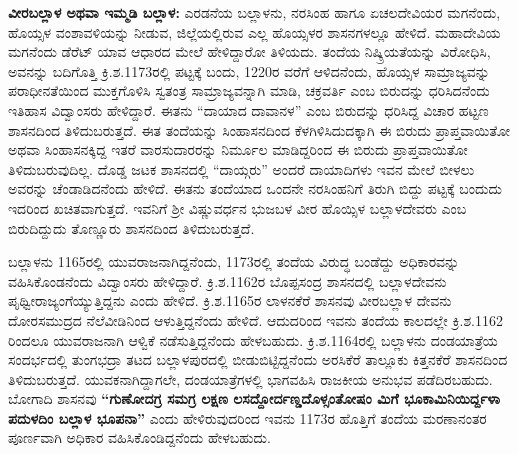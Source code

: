 \textbf{ವೀರಬಲ್ಲಾಳ ಅಥವಾ ಇಮ್ಮಡಿ ಬಲ್ಲಾಳ:} ಎರಡನೆಯ ಬಲ್ಲಾಳನು, ನರಸಿಂಹ ಹಾಗೂ ಏಚಲದೇವಿಯರ ಮಗನೆಂದು, ಹೊಯ್ಸಳ ವಂಶಾವಳಿಯನ್ನು ನೀಡುವ, ಜಿಲ್ಲೆಯಲ್ಲಿರುವ ಎಲ್ಲ ಹೊಯ್ಸಳರ ಶಾಸನಗಳಲ್ಲೂ ಹೇಳಿದೆ. ಮಹಾದೇವಿಯ ಮಗನೆಂದು ಡೆರೆಟ್​ ಯಾವ ಆಧಾರದ ಮೇಲೆ ಹೇಳಿದ್ದಾರೋ ತಿಳಿಯದು. ತಂದೆಯ ನಿಷ್ಕ್ರಿಯತೆಯನ್ನು ವಿರೋಧಿಸಿ, ಅವನನ್ನು ಬದಿಗೊತ್ತಿ ಕ್ರಿ.ಶ.1173ರಲ್ಲಿ ಪಟ್ಟಕ್ಕೆ ಬಂದು, 1220ರ ವರೆಗೆ ಆಳಿದನೆಂದು, ಹೊಯ್ಸಳ ಸಾಮ್ರಾಜ್ಯವನ್ನು ಪರಾಧೀನತೆಯಿಂದ ಮುಕ್ತಗೊಳಿಸಿ ಸ್ವತಂತ್ರ ಸಾಮ್ರಾಜ್ಯವನ್ನಾಗಿ ಮಾಡಿ, ಚಕ್ರವರ್ತಿ ಎಂಬ ಬಿರುದನ್ನು ಧರಿಸಿದನೆಂದು ಇತಿಹಾಸ ವಿದ್ವಾಂಸರು ಹೇಳಿದ್ದಾರೆ. ಈತನು “ದಾಯಾದ ದಾವಾನಳ” ಎಂಬ ಬಿರುದನ್ನು ಧರಿಸಿದ್ದ ವಿಚಾರ ಹಟ್ಟಣ ಶಾಸನದಿಂದ ತಿಳಿದುಬರುತ್ತದೆ. ಈತ ತಂದೆಯನ್ನು ಸಿಂಹಾಸನದಿಂದ ಕೆಳಗಿಳಿಸಿದುದಕ್ಕಾಗಿ ಈ ಬಿರುದು ಪ್ರಾಪ್ತವಾಯಿತೋ ಅಥವಾ ಸಿಂಹಾಸನಕ್ಕಿದ್ದ ಇತರೆ ವಾರಸುದಾರರನ್ನು ನಿರ್ಮೂಲ ಮಾಡಿದ್ದರಿಂದ ಈ ಬಿರುದು ಪ್ರಾಪ್ತವಾಯಿತೋ ತಿಳಿದುಬರುವುದಿಲ್ಲ. ದೊಡ್ಡ ಜಟಕ ಶಾಸನದಲ್ಲಿ “ದಾಯ್ಗರು” ಅಂದರೆ ದಾಯಾದಿಗಳು ಇವನ ಮೇಲೆ ಬೀಳಲು ಅವರನ್ನು ಚೆಂಡಾಡಿದನೆಂದು ಹೇಳಿದೆ. ಈತನು ತಂದೆಯಾದ ಒಂದನೇ ನರಸಿಂಹನಿಗೆ ತಿರುಗಿ ಬಿದ್ದು ಪಟ್ಟಕ್ಕೆ ಬಂದುದು ಇದರಿಂದ ಖಚಿತವಾಗುತ್ತದೆ. ಇವನಿಗೆ ಶ‍್ರೀ ವಿಷ್ಣುವರ್ಧನ ಭುಜಬಳ ವೀರ ಹೊಯ್ಸಿಳ ಬಲ್ಲಾಳದೇವರು ಎಂಬ ಬಿರುದಿದ್ದುದು ತೊಣ್ಣೂರು ಶಾಸನದಿಂದ ತಿಳಿದುಬರುತ್ತದೆ.

ಬಲ್ಲಾಳನು 1165ರಲ್ಲಿ ಯುವರಾಜನಾಗಿದ್ದನೆಂದು, 1173ರಲ್ಲಿ ತಂದೆಯ ವಿರುದ್ಧ ಬಂಡೆದ್ದು ಅಧಿಕಾರವನ್ನು ವಹಿಸಿಕೊಂಡ\-ನೆಂದು ವಿದ್ವಾಂಸರು ಹೇಳಿದ್ದಾರೆ. ಕ್ರಿ.ಶ.1162ರ ಬೊಪ್ಪಸಂದ್ರ ಶಾಸನದಲ್ಲಿ ಬಲ್ಲಾಳದೇವನು ಪೃಥ್ವೀರಾಜ್ಯಂ\-ಗೆಯ್ಯುತ್ತಿದ್ದನು ಎಂದು ಹೇಳಿದೆ. ಕ್ರಿ.ಶ.1165ರ ಲಾಳನಕೆರೆ ಶಾಸನವು ವೀರಬಲ್ಲಾಳ ದೇವನು ದೋರಸಮುದ್ರದ ನೆಲೆವೀಡಿನಿಂದ ಆಳುತ್ತಿದ್ದನೆಂದು ಹೇಳಿದೆ. ಆದುದರಿಂದ ಇವನು ತಂದೆಯ ಕಾಲದಲ್ಲೇ ಕ್ರಿ.ಶ.1162 ರಿಂದಲೂ ಯುವರಾಜನಾಗಿ ಆಳ್ವಿಕೆ ನಡೆಸುತ್ತಿದ್ದನೆಂದು ಹೇಳಬಹುದು. ಕ್ರಿ.ಶ.1164ರಲ್ಲಿ ಬಲ್ಲಾಳನು ದಂಡಯಾತ್ರೆಯ ಸಂದರ್ಭದಲ್ಲಿ ತುಂಗಭದ್ರಾ ತಟದ ಬಲ್ಲಾಳಪುರದಲ್ಲಿ ಬೀಡುಬಿಟ್ಟಿದ್ದನೆಂದು ಅರಸಿಕೆರೆ ತಾಲ್ಲೂಕು ಕಿತ್ತನಕೆರೆ ಶಾಸನದಿಂದ ತಿಳಿದುಬರುತ್ತದೆ. ಯುವಕನಾಗಿದ್ದಾಗಲೇ, ದಂಡಯಾತ್ರೆಗಳಲ್ಲಿ ಭಾಗವಹಿಸಿ ರಾಜಕೀಯ ಅನುಭವ ಪಡೆದಿರಬಹುದು. ಬೋಗಾದಿ ಶಾಸನವು \textbf{“ಗುಣೋದಗ್ರ ಸಮಗ್ರ ಲಕ್ಷಣ ಲಸದ್ದೋರ್ದಣ್ಡದೊಳ್ಸಂತೋಷಂ ಮಿಗೆ ಭೂಕಾಮಿನಿಯಿರ್ದ್ದಳಾ ಪದುಳದಿಂ ಬಲ್ಲಾಳ ಭೂಪನಾ”} ಎಂದು ಹೇಳಿರುವುದರಿಂದ ಇವನು 1173ರ ಹೊತ್ತಿಗೆ ತಂದೆಯ ಮರಣಾನಂತರ ಪೂರ್ಣವಾಗಿ ಅಧಿಕಾರ ವಹಿಸಿಕೊಂಡಿದ್ದನೆಂದು ಹೇಳಬಹುದು.


